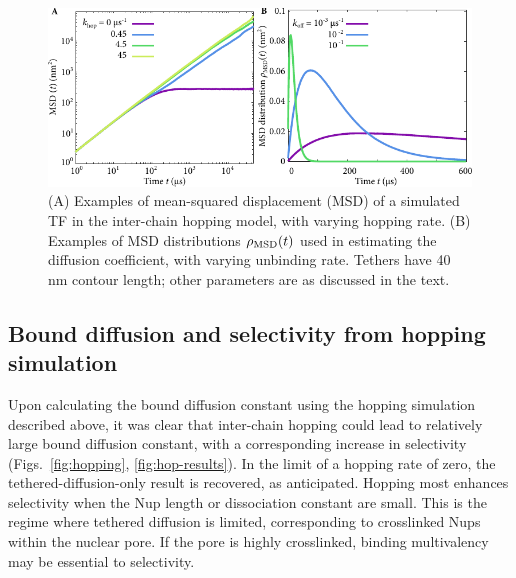 \begin{figure}[h!]
\centering
\includegraphics[width=0.7\linewidth]{figs/ch02/integrand-example-plots.pdf}
\caption[Mean-squared displacement in the hopping simulation.]{(A) Examples of mean-squared displacement (MSD) of a simulated TF in the inter-chain hopping model, with varying hopping rate.  (B) Examples of MSD distributions $\rho_{\mathrm{MSD}} (t)$ used in estimating the diffusion coefficient, with varying unbinding rate. Tethers have 40 nm contour length; other parameters are as discussed in the text.}
\label{fig:integrand}
\end{figure}

\subsection{Bound diffusion and selectivity from hopping simulation}

Upon calculating the bound diffusion constant using the hopping simulation described above, it was clear that inter-chain hopping could lead to relatively large bound diffusion constant, with a corresponding increase in selectivity (Figs.~\ref{fig:hopping}, \ref{fig:hop-results}).  In the limit of a hopping rate of zero, the tethered-diffusion-only result is recovered, as anticipated.  Hopping most enhances selectivity when the Nup length or dissociation constant are small.  This is the regime where tethered diffusion is limited, corresponding to crosslinked Nups within the nuclear pore.  If the pore is highly crosslinked, binding multivalency may be essential to selectivity.

